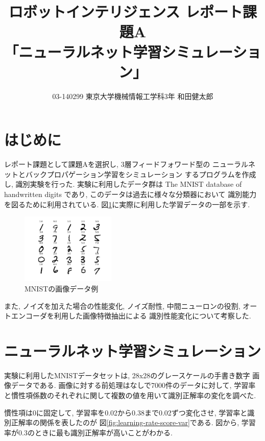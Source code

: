 \documentclass[10pt,a4paper,twocolumn]{jarticle}
\title{ロボットインテリジェンス レポート課題A \\
      「ニューラルネット学習シミュレーション」}
\author{03-140299 東京大学機械情報工学科3年 和田健太郎}
\begin{document}
\maketitle

\section{はじめに}
レポート課題として課題Aを選択し, 3層フィードフォワード型の
ニューラルネットとバックプロパゲーション学習をシミュレーション
するプログラムを作成し, 識別実験を行った. 
実験に利用したデータ群は
The MNIST database of handwritten digits
であり, このデータは過去に様々な分類器において
識別能力を図るために利用されている. \cite{mnist}
図\ref{fig:plot-mnist}に実際に利用した学習データの一部を示す. 
\begin{figure}[htbp]
  \centering
  \includegraphics[width=0.4\textwidth]{assets/img/plot_mnist.pdf}
  \caption{MNISTの画像データ例}
  \label{fig:plot-mnist}
\end{figure}

また, ノイズを加えた場合の性能変化, ノイズ耐性, 
中間ニューロンの役割, オートエンコーダを利用した画像特徴抽出による
識別性能変化について考察した. 

\section{ニューラルネット学習シミュレーション}
実験に利用したMNISTデータセットは, 28x28のグレースケールの手書き数字
画像データである. 画像に対する前処理はなしで7000件のデータに対して,
学習率と慣性項係数のそれぞれに関して複数の値を用いて識別正解率の変化を調べた. 

慣性項は0に固定して, 学習率を0.02から0.38まで0.02ずつ変化させ,
学習率と識別正解率の関係を表したのが
図\ref{fig:learning-rate-score-var}である. 
図から, 学習率が0.3のときに最も識別正解率が高いことがわかる. 
\end{document}
